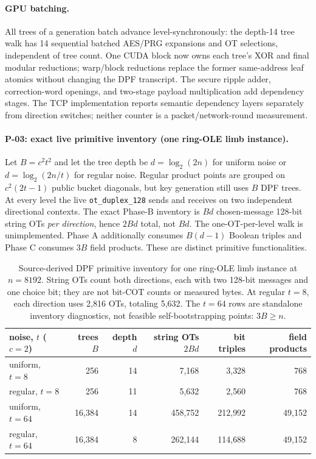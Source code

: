 \documentclass[11pt]{article}
\begin{document}
\paragraph{GPU batching.} All trees of a generation batch advance
level-synchronously: the depth-14 tree walk has 14 sequential batched
AES/PRG expansions and OT selections, independent of tree count. One CUDA
block now owns each tree's XOR and final modular reductions; warp/block
reductions replace the former same-address leaf atomics without changing the
DPF transcript. The secure ripple adder, correction-word openings, and
two-stage payload multiplication add dependency stages. The TCP implementation
reports semantic dependency layers separately from direction switches; neither
counter is a packet/network-round measurement.

\paragraph{P-03: exact live primitive inventory (one ring-OLE limb instance).}
Let $B=c^2t^2$ and let the tree depth be $d=\log_2(2n)$ for uniform noise
or $d=\log_2(2n/t)$ for regular noise. Regular product points are grouped
on $c^2(2t-1)$ public bucket diagonals, but key generation still uses $B$
DPF trees. At every level the live \texttt{ot\_duplex\_128} sends and receives
on two independent directional contexts. The exact Phase-B inventory is
$Bd$ chosen-message 128-bit string OTs \emph{per direction}, hence $2Bd$
total, not $Bd$. The one-OT-per-level walk is unimplemented.
Phase A additionally consumes $B(d-1)$ Boolean triples and Phase C consumes
$3B$ field products. These are distinct primitive functionalities.

\begin{table}[ht]
\centering
\small
\begin{tabular}{lrrrrr}
\toprule
noise, $t$ ($c{=}2$) & trees $B$ & depth $d$ & string OTs $2Bd$ & bit triples & field products\\
\midrule
uniform, $t{=}8$ & 256 & 14 & 7{,}168 & 3{,}328 & 768\\
regular, $t{=}8$ & 256 & 11 & 5{,}632 & 2{,}560 & 768\\
uniform, $t{=}64$ & 16{,}384 & 14 & 458{,}752 & 212{,}992 & 49{,}152\\
regular, $t{=}64$ & 16{,}384 & 8 & 262{,}144 & 114{,}688 & 49{,}152\\
\bottomrule
\end{tabular}
\caption{Source-derived DPF primitive inventory for one ring-OLE limb
instance at $n=8192$. String OTs count both directions, each with two 128-bit
messages and one choice bit; they are not bit-COT counts or measured bytes.
At regular $t=8$, each direction uses 2{,}816 OTs, totaling 5{,}632.
The $t=64$ rows are standalone inventory diagnostics, not feasible
self-bootstrapping points: $3B\ge n$.}
\label{tab:keygen}
\end{table}
\end{document}

